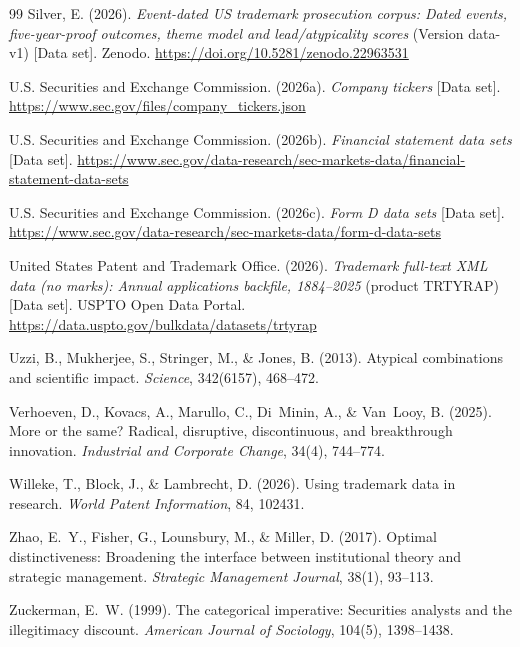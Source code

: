 \begin{thebibliography}{99}
Silver, E. (2026). \emph{Event-dated US trademark prosecution corpus: Dated
events, five-year-proof outcomes, theme model and lead/atypicality scores}
(Version data-v1)
[Data set]. Zenodo. \url{https://doi.org/10.5281/zenodo.22963531}

U.S. Securities and Exchange Commission. (2026a). \emph{Company tickers}
[Data set]. \url{https://www.sec.gov/files/company_tickers.json}

U.S. Securities and Exchange Commission. (2026b). \emph{Financial statement
data sets} [Data set].
\url{https://www.sec.gov/data-research/sec-markets-data/financial-statement-data-sets}

U.S. Securities and Exchange Commission. (2026c). \emph{Form D data sets}
[Data set]. \url{https://www.sec.gov/data-research/sec-markets-data/form-d-data-sets}

United States Patent and Trademark Office. (2026). \emph{Trademark full-text
XML data (no marks): Annual applications backfile, 1884--2025} (product
TRTYRAP) [Data set]. USPTO Open Data Portal.
\url{https://data.uspto.gov/bulkdata/datasets/trtyrap}

Uzzi, B., Mukherjee, S., Stringer, M., \& Jones, B. (2013). Atypical
combinations and scientific impact. \emph{Science}, 342(6157), 468--472.

Verhoeven, D., Kovacs, A., Marullo, C., Di~Minin, A., \& Van~Looy, B.
(2025). More or the same? Radical, disruptive, discontinuous, and
breakthrough innovation. \emph{Industrial and Corporate Change}, 34(4),
744--774.

Willeke, T., Block, J., \& Lambrecht, D. (2026). Using trademark data in
research. \emph{World Patent Information}, 84, 102431.

Zhao, E.~Y., Fisher, G., Lounsbury, M., \& Miller, D. (2017). Optimal
distinctiveness: Broadening the interface between institutional theory and
strategic management. \emph{Strategic Management Journal}, 38(1), 93--113.

Zuckerman, E.~W. (1999). The categorical imperative: Securities analysts
and the illegitimacy discount. \emph{American Journal of Sociology},
104(5), 1398--1438.

\end{thebibliography}
